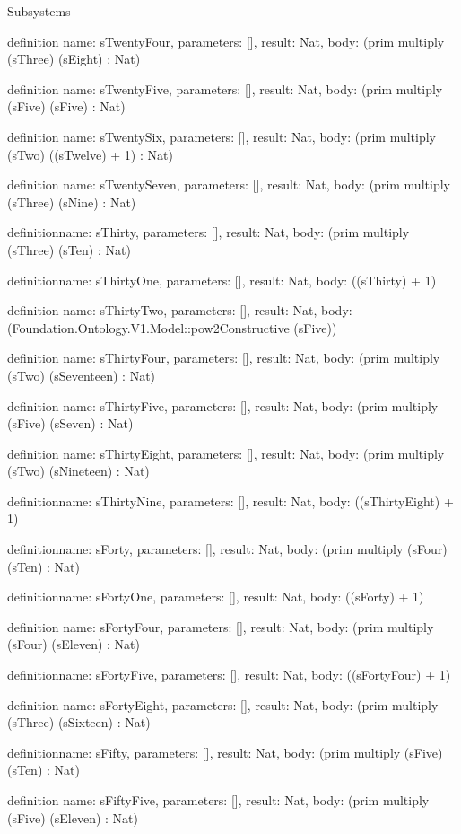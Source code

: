 \begin{lexlean}{Subsystems}
\begin{semanticmodule}
definition{
  name: sTwentyFour,
  parameters: [],
  result: Nat,
  body: (prim multiply (sThree) (sEight) : Nat)
}

definition{
  name: sTwentyFive,
  parameters: [],
  result: Nat,
  body: (prim multiply (sFive) (sFive) : Nat)
}

definition{
  name: sTwentySix,
  parameters: [],
  result: Nat,
  body: (prim multiply (sTwo) ((sTwelve) + 1) : Nat)
}

definition{
  name: sTwentySeven,
  parameters: [],
  result: Nat,
  body: (prim multiply (sThree) (sNine) : Nat)
}

definition{name: sThirty, parameters: [], result: Nat, body: (prim multiply (sThree) (sTen) : Nat)}

definition{name: sThirtyOne, parameters: [], result: Nat, body: ((sThirty) + 1)}

definition{
  name: sThirtyTwo,
  parameters: [],
  result: Nat,
  body: (Foundation.Ontology.V1.Model::pow2Constructive (sFive))
}

definition{
  name: sThirtyFour,
  parameters: [],
  result: Nat,
  body: (prim multiply (sTwo) (sSeventeen) : Nat)
}

definition{
  name: sThirtyFive,
  parameters: [],
  result: Nat,
  body: (prim multiply (sFive) (sSeven) : Nat)
}

definition{
  name: sThirtyEight,
  parameters: [],
  result: Nat,
  body: (prim multiply (sTwo) (sNineteen) : Nat)
}

definition{name: sThirtyNine, parameters: [], result: Nat, body: ((sThirtyEight) + 1)}

definition{name: sForty, parameters: [], result: Nat, body: (prim multiply (sFour) (sTen) : Nat)}

definition{name: sFortyOne, parameters: [], result: Nat, body: ((sForty) + 1)}

definition{
  name: sFortyFour,
  parameters: [],
  result: Nat,
  body: (prim multiply (sFour) (sEleven) : Nat)
}

definition{name: sFortyFive, parameters: [], result: Nat, body: ((sFortyFour) + 1)}

definition{
  name: sFortyEight,
  parameters: [],
  result: Nat,
  body: (prim multiply (sThree) (sSixteen) : Nat)
}

definition{name: sFifty, parameters: [], result: Nat, body: (prim multiply (sFive) (sTen) : Nat)}

definition{
  name: sFiftyFive,
  parameters: [],
  result: Nat,
  body: (prim multiply (sFive) (sEleven) : Nat)
}


\end{semanticmodule}
\end{lexlean}
